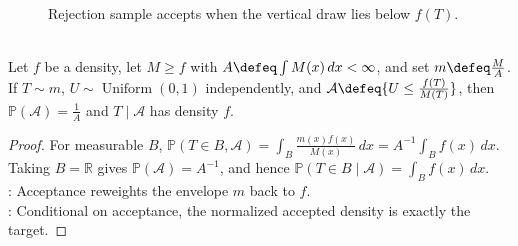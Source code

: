 \begin{figure}[H]
  \centering
  
  \caption{Rejection sample accepts when the vertical draw lies below $f(T)$.}
  \label{fig:rejection-sampling-envelope}
\end{figure}

\begin{proposition} \label{prop:rejection-sampling-correctness} \\
Let $f$ be a density, let $M\geq f$ with $A\defeq\int M(x)\,dx<\infty$, and set $m\defeq \frac{M}{A}$. If $T\sim m$, $U\sim\operatorname{Uniform}(0,1)$ independently, and $\mathcal{A}\defeq\{U\leq \frac{f(T)}{M(T)}\}$, then $\mathbb{P}(\mathcal{A})=\frac{1}{A}$ and $T\mid\mathcal{A}$ has density $f$.
\begin{proof} For measurable $B$, $\mathbb{P}(T\in B,\mathcal{A})=\int_B \frac{m(x)f(x)}{M(x)}\,dx=A^{-1}\int_B f(x)\,dx$.\\
Taking $B=\mathbb{R}$ gives $\mathbb{P}(\mathcal{A})=A^{-1}$, and hence $\mathbb{P}(T\in B\mid\mathcal{A})=\int_B f(x)\,dx$.\\
: Acceptance reweights the envelope $m$ back to $f$.\\
: Conditional on acceptance, the normalized accepted density is exactly the target.
\end{proof}
\end{proposition}

